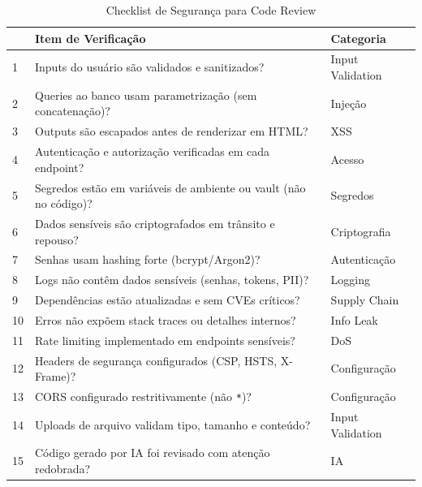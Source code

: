 \begin{table}[htbp]
\centering
\caption{Checklist de Segurança para Code Review}
\small
\begin{tabular}{@{}p{0.6cm}p{8cm}p{3cm}@{}}
\toprule
& \textbf{Item de Verificação} & \textbf{Categoria} \\
\midrule
1 & Inputs do usuário são validados e sanitizados? & Input Validation \\
2 & Queries ao banco usam parametrização (sem concatenação)? & Injeção \\
3 & Outputs são escapados antes de renderizar em HTML? & XSS \\
4 & Autenticação e autorização verificadas em cada endpoint? & Acesso \\
5 & Segredos estão em variáveis de ambiente ou vault (não no código)? & Segredos \\
6 & Dados sensíveis são criptografados em trânsito e repouso? & Criptografia \\
7 & Senhas usam hashing forte (bcrypt/Argon2)? & Autenticação \\
8 & Logs não contêm dados sensíveis (senhas, tokens, PII)? & Logging \\
9 & Dependências estão atualizadas e sem CVEs críticos? & Supply Chain \\
10 & Erros não expõem stack traces ou detalhes internos? & Info Leak \\
11 & Rate limiting implementado em endpoints sensíveis? & DoS \\
12 & Headers de segurança configurados (CSP, HSTS, X-Frame)? & Configuração \\
13 & CORS configurado restritivamente (não \texttt{*})? & Configuração \\
14 & Uploads de arquivo validam tipo, tamanho e conteúdo? & Input Validation \\
15 & Código gerado por IA foi revisado com atenção redobrada? & IA \\
\bottomrule
\end{tabular}
\end{table}
